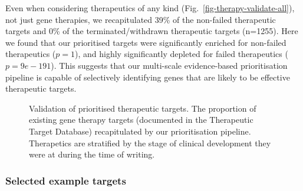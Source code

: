 \documentclass[
]{agujournal2019}
\begin{document}
Even when considering therapeutics of any kind
(Fig.~\ref{fig-therapy-validate-all}), not just gene therapies, we
recapitulated 39\% of the non-failed therapeutic targets and 0\% of the
terminated/withdrawn therapeutic targets (n=1255). Here we found that
our prioritised targets were significantly enriched for non-failed
therapeutics (\(p=1\)), and highly significantly depleted for failed
therapeutics (\(p=9e-191\)). This suggests that our multi-scale
evidence-based prioritisation pipeline is capable of selectively
identifying genes that are likely to be effective therapeutic targets.

\label{cell-fig-therapy-validate}
\begin{figure}[H]


\caption{\label{fig-therapy-validate}Validation of prioritised
therapeutic targets. The proportion of existing gene therapy targets
(documented in the Therapeutic Target Database) recapitulated by our
prioritisation pipeline. Therapetics are stratified by the stage of
clinical development they were at during the time of writing.}

\end{figure}%

\subsubsection{Selected example targets}\label{selected-example-targets}
\end{document}
